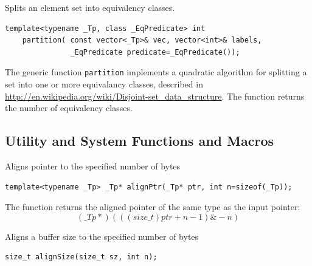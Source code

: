 \label{partition}
Splits an element set into equivalency classes.

\begin{lstlisting}
template<typename _Tp, class _EqPredicate> int
    partition( const vector<_Tp>& vec, vector<int>& labels,
               _EqPredicate predicate=_EqPredicate());
\end{lstlisting}
\begin{description}
\end{description}

The generic function \texttt{partition} implements a quadratic algorithm for
splitting a set into one or more equivalancy classes, described in \url{http://en.wikipedia.org/wiki/Disjoint-set_data_structure}. The function
returns the number of equivalency classes.

\subsection{Utility and System Functions and Macros}

\label{alignPtr}
Aligns pointer to the specified number of bytes

\begin{lstlisting}
template<typename _Tp> _Tp* alignPtr(_Tp* ptr, int n=sizeof(_Tp));
\end{lstlisting}
\begin{description}
\end{description}

The function returns the aligned pointer of the same type as the input pointer:
\[(\_Tp*)(((size\_t)ptr + n-1) \& -n)\]


\label{alignSize}
Aligns a buffer size to the specified number of bytes

\begin{lstlisting}
size_t alignSize(size_t sz, int n);
\end{lstlisting}
\begin{description}
\end{description}

